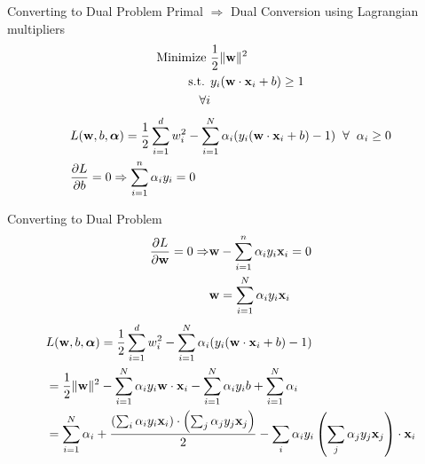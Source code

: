 \documentclass{beamer}
\begin{document}
\begin{frame}{Converting to Dual Problem}
Primal $\Rightarrow$ Dual Conversion using Lagrangian multipliers\\
\begin{align*}
	\text{Minimize } & \frac{1}{2}\|\mathbf{w}\|^{2} \\
	\text{s.t. } & y_{i}(\mathbf{w} \cdot \mathbf{x}_{i} + b) \geq 1\\
	 \hspace{2mm}\forall i
	\end{align*}
\begin{align*}
&L(\mathbf{w},b,\boldsymbol{\alpha}) = \frac{1}{2}
\sum_{i = 1}^{d} w_{i}^{2} - \sum_{i=1}^{N} \alpha_{i}(y_{i}(\mathbf{w} \cdot \mathbf{x}_{i} + b) - 1) \hspace{2mm} \forall \hspace{2mm}\alpha_{i} \geq 0\\
&\frac{\partial L}{\partial b} = 0 \Rightarrow \sum_{i=1}^{n}\alpha_{i}y_{i} = 0\\
\end{align*}
\end{frame}

\begin{frame}{Converting to Dual Problem}
\begin{align*}
\frac{\partial L}{\partial \mathbf{w}} = 0 \Rightarrow & \mathbf{w} - \sum_{i=1}^{n}\alpha_{i}y_{i}\mathbf{x}_{i} = 0\\
& \mathbf{w} = \sum_{i=1}^{N}\alpha_{i}y_{i}\mathbf{x}_{i}
\end{align*}
\begin{align*}
&L(\mathbf{w},b,\boldsymbol{\alpha}) = \frac{1}{2}
\sum_{i = 1}^{d} w_{i}^{2} - \sum_{i=1}^{N} \alpha_{i}(y_{i}(\mathbf{w} \cdot \mathbf{x}_i + b) -1)\\
&= \frac{1}{2}\|\mathbf{w}\|^{2}-\sum_{i=1}^{N} \alpha_{i} y_{i} \mathbf{w} \cdot \mathbf{x}_{i}-\sum_{i=1}^{N} \alpha_{i} y_{i} b+\sum_{i=1}^{N} \alpha_{i}\\
&= \sum_{i=1}^{N} \alpha_{i}+\frac{\left(\sum_{i} \alpha_{i} y_{i} \mathbf{x}_{i}\right) \cdot \left(\sum_{j} \alpha_{j} y_{j} \mathbf{x}_{j}\right)}{2}-\sum_{i} \alpha_{i} y_{i}\left(\sum_{j} \alpha_{j} y_{j} \mathbf{x}_{j}\right) \cdot \mathbf{x}_{i}
\end{align*}
\end{frame}
\end{document}
